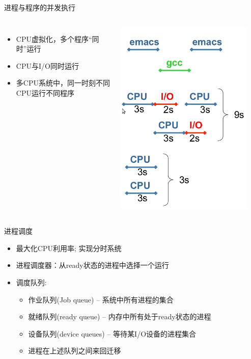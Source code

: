 \documentclass[xcolor=svgnames]{beamer}
\begin{document}
\begin{CJK*}{UTF8}{gbsn}
\begin{frame}{进程与程序的并发执行}
\begin{columns}%
\begin{itemize}
\item CPU虚拟化，多个程序“同时”运行
\item CPU与I/O同时运行
\item 多CPU系统中，同一时刻不同CPU运行不同程序
\end{itemize}
\includegraphics[width=0.9\textwidth]{parallel.png}
\end{columns}%
\end{frame}

\begin{frame}{进程调度}
\begin{itemize}
\item 最大化CPU利用率; 实现分时系统
\item 进程调度器：从ready状态的进程中选择一个运行
\item 调度队列:
\begin{itemize}
\item 作业队列(Job queue) -- 系统中所有进程的集合
\item 就绪队列(ready queue) -- 内存中所有处于ready状态的进程
\item 设备队列(device queues) -- 等待某I/O设备的进程集合
\item 进程在上述队列之间来回迁移
\end{itemize}
\end{itemize}
\end{frame}


\end{CJK*}
\end{document}
